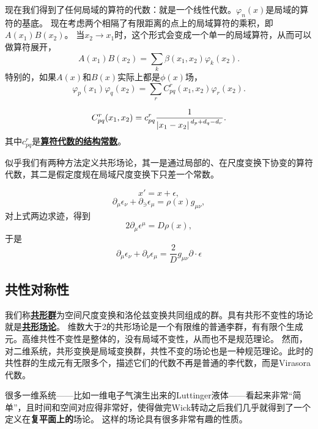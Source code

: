 \documentclass[hyperref, UTF8, a4paper]{ctexart}
\newcommand{\concept}[1]{\underline{\textbf{#1}}}
\renewcommand{\emph}{\textbf}
\begin{document}
现在我们得到了任何局域的算符的代数：就是一个线性代数。$\varphi_n(x)$是局域的算符的基底。
现在考虑两个相隔了有限距离的点上的局域算符的乘积，即$A(x_1) B(x_2)$。
当$x_2 \to x_1$时，这个形式会变成一个单一的局域算符，从而可以做算符展开，
\begin{equation}
    A(x_1) B(x_2) = \sum_{k} \beta(x_1, x_2) \varphi_k(x_2).
\end{equation}
特别的，如果$A(x)$和$B(x)$实际上都是$\phi(x)$场，
\begin{equation}
    \varphi_p(x_1) \varphi_q(x_2) = \sum_{r} C_{pq}^r(x_1, x_2) \varphi_r(x_2). 
\end{equation}

\begin{equation}
    C_{pq}^r(x_1, x_2) = c_{pq}^r \frac{1}{\abs*{x_1 - x_2}^{d_p + d_q - d_r}}.
\end{equation}
其中$c_{pq}^r$是\concept{算符代数的结构常数}。

似乎我们有两种方法定义共形场论，其一是通过局部的、在尺度变换下协变的算符代数，其二是假定度规在局域尺度变换下只差一个常数。

\begin{equation}
    x' = x + \epsilon,
\end{equation}
\begin{equation}
    \partial_\mu \epsilon_\nu + \partial_\ni \epsilon_\mu = \rho(x) g_{\mu \nu},
\end{equation}
对上式两边求迹，得到
\[
    2 \partial_\mu \epsilon^\mu = D \rho(x),
\]
于是
\begin{equation}
    \partial_\mu \epsilon_\nu + \partial_\nu \epsilon_\mu = \frac{2}{D} g_{\mu \nu} \partial \cdot \epsilon
\end{equation}


\subsection{共性对称性}

我们称\concept{共形群}为空间尺度变换和洛伦兹变换共同组成的群。具有共形不变性的场论就是\concept{共形场论}。
维数大于2的共形场论是一个有限维的普通李群，有有限个生成元。高维共性不变性是整体的，没有局域不变性，从而也不是规范理论。
然而，对二维系统，共形变换是局域变换群，共性不变的场论也是一种规范理论。此时的共性群的生成元有无限多个，描述它们的代数不再是普通的李代数，而是Virasora代数。

很多一维系统——比如一维电子气演生出来的Luttinger液体——看起来非常“简单”，且时间和空间对应得非常好，使得做完Wick转动之后我们几乎就得到了一个定义在\emph{复平面上的}场论。
这样的场论具有很多非常有趣的性质。
\end{document}
